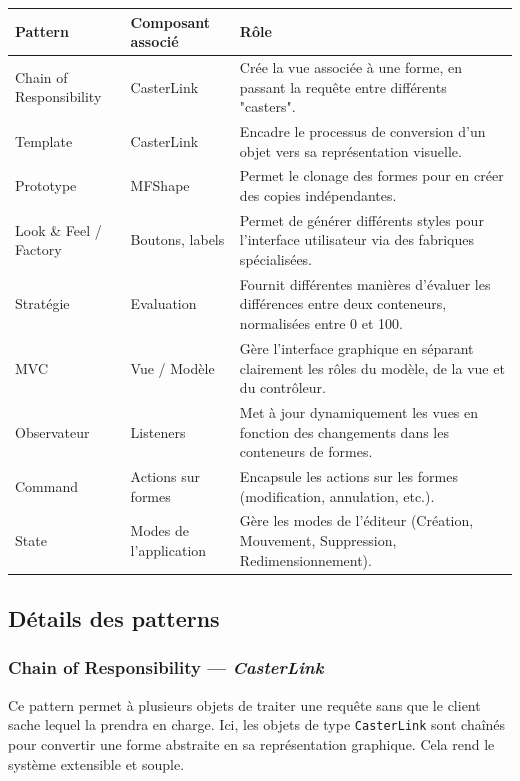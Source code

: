 \documentclass[11pt]{article}
\begin{document}
\begin{center}
\begin{tabular}{|l|p{4cm}|p{7cm}|}
\hline
\textbf{Pattern} & \textbf{Composant associé} & \textbf{Rôle} \\
\hline
Chain of Responsibility & CasterLink & Crée la vue associée à une forme, en passant la requête entre différents "casters". \\
\hline
Template & CasterLink & Encadre le processus de conversion d’un objet vers sa représentation visuelle. \\
\hline
Prototype & MFShape & Permet le clonage des formes pour en créer des copies indépendantes. \\
\hline
Look \& Feel / Factory & Boutons, labels & Permet de générer différents styles pour l’interface utilisateur via des fabriques spécialisées. \\
\hline
Stratégie & Evaluation & Fournit différentes manières d’évaluer les différences entre deux conteneurs, normalisées entre 0 et 100. \\
\hline
MVC & Vue / Modèle & Gère l’interface graphique en séparant clairement les rôles du modèle, de la vue et du contrôleur. \\
\hline
Observateur & Listeners & Met à jour dynamiquement les vues en fonction des changements dans les conteneurs de formes. \\
\hline
Command & Actions sur formes & Encapsule les actions sur les formes (modification, annulation, etc.). \\
\hline
State & Modes de l'application & Gère les modes de l’éditeur (Création, Mouvement, Suppression, Redimensionnement). \\
\hline
\end{tabular}
\end{center}

\vspace{1cm}

\subsection{Détails des patterns}

\subsubsection{Chain of Responsibility — \textit{CasterLink}}
Ce pattern permet à plusieurs objets de traiter une requête sans que le client sache lequel la prendra en charge. Ici, les objets de type \texttt{CasterLink} sont chaînés pour convertir une forme abstraite en sa représentation graphique. Cela rend le système extensible et souple.
\end{document}
